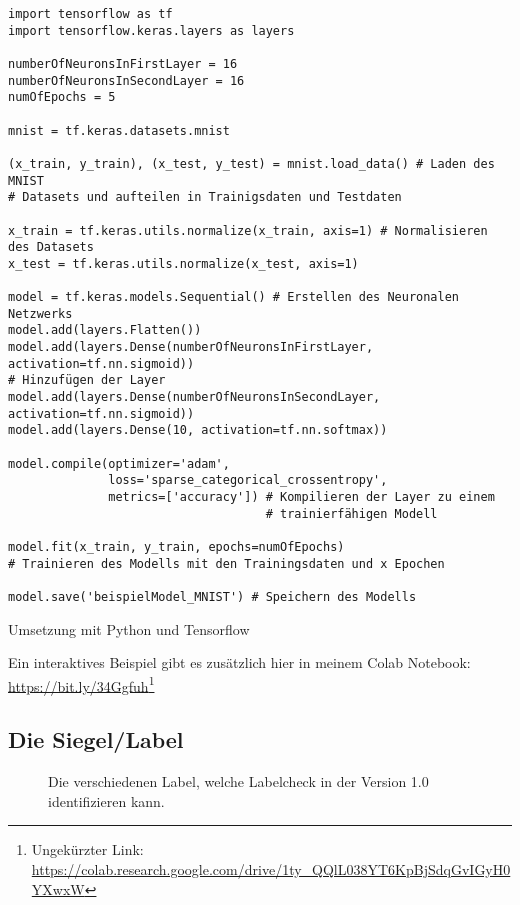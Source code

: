 \begin{listing}[H]
    \begin{verbatim}
import tensorflow as tf
import tensorflow.keras.layers as layers

numberOfNeuronsInFirstLayer = 16 
numberOfNeuronsInSecondLayer = 16 
numOfEpochs = 5 

mnist = tf.keras.datasets.mnist

(x_train, y_train), (x_test, y_test) = mnist.load_data() # Laden des MNIST
# Datasets und aufteilen in Trainigsdaten und Testdaten

x_train = tf.keras.utils.normalize(x_train, axis=1) # Normalisieren des Datasets
x_test = tf.keras.utils.normalize(x_test, axis=1)

model = tf.keras.models.Sequential() # Erstellen des Neuronalen Netzwerks
model.add(layers.Flatten())
model.add(layers.Dense(numberOfNeuronsInFirstLayer, activation=tf.nn.sigmoid))
# Hinzufügen der Layer
model.add(layers.Dense(numberOfNeuronsInSecondLayer, activation=tf.nn.sigmoid))
model.add(layers.Dense(10, activation=tf.nn.softmax))

model.compile(optimizer='adam',
              loss='sparse_categorical_crossentropy',
              metrics=['accuracy']) # Kompilieren der Layer zu einem
                                    # trainierfähigen Modell

model.fit(x_train, y_train, epochs=numOfEpochs)
# Trainieren des Modells mit den Trainingsdaten und x Epochen

model.save('beispielModel_MNIST') # Speichern des Modells

    \end{verbatim}
    \caption{Umsetzung mit Python und Tensorflow}
\end{listing}
Ein interaktives Beispiel gibt es zusätzlich hier in meinem Colab Notebook: \url{https://bit.ly/34Ggfuh}\footnote{Ungekürzter Link: \url{https://colab.research.google.com/drive/1ty_QQlL038YT6KpBjSdqGvIGyH0YXwxW}}

\subsection{Die Siegel/Label}\label{angang:label}

\begin{figure}[H]
    \centering
    \qquad
    \qquad
    \qquad
    \qquad
    \qquad
    \qquad
    \caption[Label]{Die verschiedenen Label, welche Labelcheck in der Version 1.0 identifizieren kann.}
    \label{labels}%
\end{figure}

